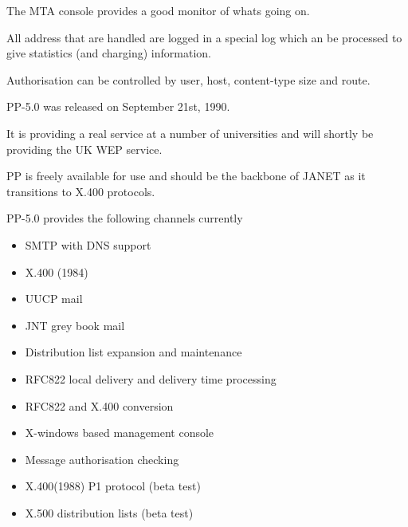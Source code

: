 \begin{bwslide}
\begin{nrtc}
\item The MTA console provides a good monitor of whats going on.
\item All address that are handled are logged in a special log which
an be processed to give statistics (and charging) information.
\item Authorisation can be controlled by user, host, content-type size
and route.
\end{nrtc}
\end{bwslide}

\begin{bwslide}
\begin{nrtc}
\item	PP-5.0 was released on September 21st, 1990.

\item	It is providing a real service at a number of universities and
	will shortly be providing the UK WEP service.

\item	PP is freely available for use and should be the backbone of
	JANET as it transitions to X.400 protocols.

\end{nrtc}
\end{bwslide}

\begin{bwslide}
\begin{nrtc}
\item PP-5.0 provides the following channels currently

	\begin{itemize}
	\item SMTP with DNS support
	\item X.400 (1984)
	\item UUCP mail
	\item JNT grey book mail
	\item Distribution list expansion and maintenance
	\item RFC822 local delivery and delivery time processing
	\item RFC822 and X.400 conversion
	\item X-windows based management console
	\item Message authorisation checking
	\item X.400(1988) P1 protocol (beta test)
	\item X.500 distribution lists (beta test)
	\end{itemize}

\end{nrtc}
\end{bwslide}

